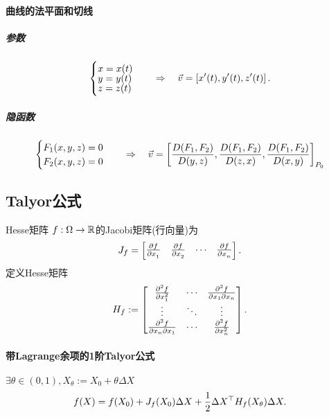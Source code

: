 \paragraph{曲线的法平面和切线}
\subparagraph{参数}
\begin{align*}
	\begin{cases}
		x=x(t) \\[-1ex]
		y=y(t) \\[-1ex]
		z=z(t)
	\end{cases}
	\quad\Rightarrow\quad\vec v=\left[x'(t),y'(t),z'(t)\right].
\end{align*}
\subparagraph{隐函数}
\begin{align*}
	\begin{cases}
		F_1(x,y,z)=0 \\
		F_2(x,y,z)=0
	\end{cases}
	\quad\Rightarrow\quad\vec v=\left[\frac{D(F_1,F_2)}{D(y,z)},\frac{D(F_1,F_2)}{D(z,x)},\frac{D(F_1,F_2)}{D(x,y)}
		\right]_{P_0}
\end{align*}
\newpage
\subsection{Talyor公式}
\begin{definition}{Hesse矩阵}{}
	$f:\Omega\to\mathbb R$的Jacobi矩阵(行向量)为
	\begin{align*}
		J_f=
		\begin{bmatrix}
			\pv f{x_1} & \pv f{x_2} & \cdots & \pv f{x_n}
		\end{bmatrix}.
	\end{align*}
	定义Hesse矩阵
	\begin{align*}
		H_f:=
		\begin{bmatrix}
			\frac{\partial^2f}{\partial x_1^2}     & \cdots & \frac{\partial^2f}{\partial x_1\partial x_n} \\
			\vdots                     & \ddots & \vdots                     \\
			\frac{\partial^2f}{\partial x_n\partial x_1} & \cdots & \frac{\partial^2f}{\partial x_n^2}
		\end{bmatrix}.
	\end{align*}
\end{definition}
\paragraph{带Lagrange余项的1阶Talyor公式}
$\exists\theta\in(0,1),X_\theta:=X_0+\theta\Delta X$
\begin{align}
	f(X)=f(X_0)+J_f(X_0)\Delta X+\frac12\Delta X^\top H_f(X_\theta)\Delta X.
\end{align}
